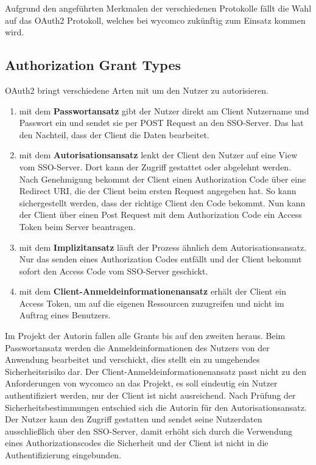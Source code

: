 Aufgrund den angeführten Merkmalen der verschiedenen Protokolle fällt die Wahl auf das OAuth2 Protokoll, welches bei wycomco zukünftig zum Einsatz kommen wird. 

\subsection{Authorization Grant Types}
\label{sec:AuthorizationGrants}

OAuth2 bringt verschiedene Arten mit um den Nutzer zu autorisieren.
\begin{enumerate}
\item mit dem \textbf{Passwortansatz} gibt der Nutzer direkt am Client Nutzername und Passwort ein und sendet sie per POST Request an den \ac{SSO}-Server. Das hat den Nachteil, dass der Client die Daten bearbeitet.
\item mit dem \textbf{Autorisationsansatz} lenkt der Client den Nutzer auf eine View vom \ac{SSO}-Server. Dort kann der Zugriff gestattet oder abgelehnt werden. Nach Genehmigung bekommt der Client einen Authorization Code über eine Redirect URI, die der Client beim ersten Request angegeben hat. So kann sichergestellt werden, dass der richtige Client den Code bekommt. Nun kann der Client über einen Post Request mit dem Authorization Code ein Access Token beim Server beantragen. 
\item mit dem \textbf{Implizitansatz} läuft der Prozess ähnlich dem Autorisationsansatz. Nur das senden eines Authorization Codes entfällt und der Client bekommt sofort den Access Code vom \ac{SSO}-Server geschickt.
\item mit dem \textbf{Client-Anmeldeinformationenansatz} erhält der Client ein Access Token, um auf die eigenen Ressourcen zuzugreifen und nicht im Auftrag eines Benutzers.
\end{enumerate}

Im Projekt der Autorin fallen alle Grants bis auf den zweiten heraus. Beim Passwortansatz werden die Anmeldeinformationen des Nutzers von der Anwendung bearbeitet und verschickt, dies stellt ein zu umgehendes Sicherheitsrisiko dar.
Der Client-Anmeldeinformationenansatz passt nicht zu den Anforderungen von wycomco an das Projekt, es soll eindeutig ein Nutzer authentifiziert werden, nur der Client ist nicht ausreichend. Nach Prüfung der Sicherheitsbestimmungen entschied sich die Autorin für den Autorisationsansatz. Der Nutzer kann den Zugriff gestatten und sendet seine Nutzerdaten ausschließlich über den \ac{SSO}-Server, damit erhöht sich durch die Verwendung eines Authorizationscodes die Sicherheit und der Client ist nicht in die Authentifizierung eingebunden.

